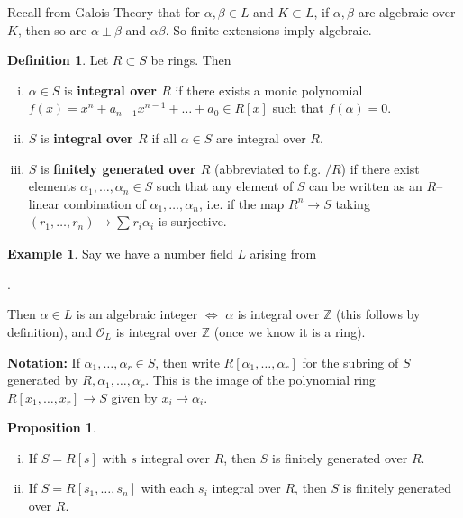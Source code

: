 \documentclass{article}
\theoremstyle{definition}
\newtheorem{prop}[theorem]{Proposition}
\newtheorem{example}{Example}[section]
\newtheorem{defn}{Definition}[section]
\begin{document}
Recall from Galois Theory that for $\alpha,\beta \in L$ and $K \subset L$, if $\alpha,\beta$ are algebraic over $K$, then so are $\alpha \pm \beta$ and $\alpha \beta$. So finite extensions imply algebraic.

\begin{defn}
    Let $R \subset S$ be rings. Then
    \begin{enumerate}[(i)]
        \item $\alpha \in S$ is \textbf{integral over $R$} if there exists a monic polynomial $f(x)=x^n + a_{n-1}x^{n-1} + \ldots + a_0 \in R[x]$ such that $f(\alpha)=0$.
        \item $S$ is \textbf{integral over $R$} if all $\alpha \in S$ are integral over $R$.
        \item $S$ is \textbf{finitely generated over $R$} (abbreviated to f.g. $/R$) if there exist elements $\alpha_1,\ldots,\alpha_n \in S$ such that any element of $S$ can be written as an $R$--linear combination of $\alpha_1,\ldots,\alpha_n$, i.e. if the map $R^n \to S$ taking $(r_1,\ldots,r_n) \to \sum_{}^{} r_i \alpha_i$ is surjective. 
    \end{enumerate}
\end{defn}
\begin{example}
    Say we have a number field $L$ arising from
    .

    Then $\alpha \in L$ is an algebraic integer $\iff$ $\alpha$ is integral over $\mathbb{Z}$ (this follows by definition), and $\mathcal{O}_L$ is integral over $\mathbb{Z}$ (once we know it is a ring).
\end{example}
\textbf{Notation:} If $\alpha_1,\ldots,\alpha_r \in S$, then write $R[\alpha_1,\ldots,\alpha_r]$ for the subring of $S$ generated by $R,\alpha_1,\ldots,\alpha_r$. This is the image of the polynomial ring $R[x_1,\ldots,x_r] \to S$ given by $x_i \mapsto \alpha_i$.
\begin{prop}\label{1.3}
    \begin{enumerate}[(i)]
        \item If $S=R[s]$ with $s$ integral over $R$, then $S$ is finitely generated over $R$.
        \item If $S=R[s_1,\ldots,s_n]$ with each $s_i$ integral over $R$, then $S$ is finitely generated over $R$.
    \end{enumerate}
\end{prop}
\end{document}
